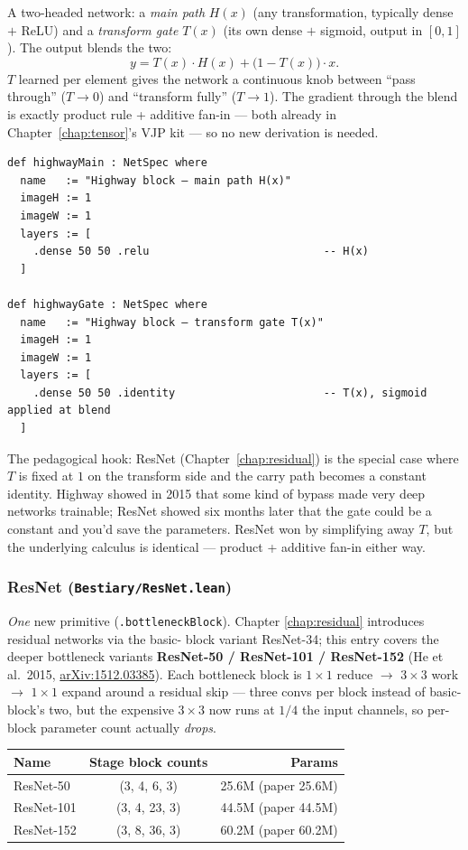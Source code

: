 A two-headed network: a \emph{main path} $H(x)$ (any transformation,
typically dense $+$ ReLU) and a \emph{transform gate} $T(x)$ (its own
dense $+$ sigmoid, output in $[0, 1]$). The output blends the two:
\[
  y = T(x) \cdot H(x) + \bigl(1 - T(x)\bigr) \cdot x.
\]
$T$ learned per element gives the network a continuous knob between
``pass through'' ($T \to 0$) and ``transform fully'' ($T \to 1$). The
gradient through the blend is exactly product rule + additive
fan-in --- both already in Chapter~\ref{chap:tensor}'s VJP kit ---
so no new derivation is needed.

\begin{verbatim}
def highwayMain : NetSpec where
  name   := "Highway block — main path H(x)"
  imageH := 1
  imageW := 1
  layers := [
    .dense 50 50 .relu                           -- H(x)
  ]

def highwayGate : NetSpec where
  name   := "Highway block — transform gate T(x)"
  imageH := 1
  imageW := 1
  layers := [
    .dense 50 50 .identity                       -- T(x), sigmoid applied at blend
  ]
\end{verbatim}

The pedagogical hook: ResNet (Chapter~\ref{chap:residual}) is the
special case where $T$ is fixed at $1$ on the transform side and the
carry path becomes a constant identity. Highway showed in 2015 that
some kind of bypass made very deep networks trainable; ResNet showed
six months later that the gate could be a constant and you'd save the
parameters. ResNet won by simplifying away $T$, but the underlying
calculus is identical --- product + additive fan-in either way.

\subsubsection*{ResNet (\texttt{Bestiary/ResNet.lean})}
\emph{One} new primitive (\texttt{.bottleneckBlock}). Chapter
\ref{chap:residual} introduces residual networks via the basic-
block variant ResNet-34; this entry covers the deeper bottleneck
variants
\textbf{ResNet-50 / ResNet-101 / ResNet-152} (He et al.\ 2015,
\href{https://arxiv.org/abs/1512.03385}{arXiv:1512.03385}). Each
bottleneck block is $1\times 1$ reduce $\to$ $3\times 3$ work
$\to$ $1\times 1$ expand around a residual skip --- three convs
per block instead of basic-block's two, but the expensive
$3\times 3$ now runs at $1/4$ the input channels, so per-block
parameter count actually \emph{drops}.

\begin{center}
\begin{tabular}{l c r}
\hline
Name & Stage block counts & Params \\
\hline
ResNet-50  & (3, 4, 6, 3)  & 25.6M (paper 25.6M) \\
ResNet-101 & (3, 4, 23, 3) & 44.5M (paper 44.5M) \\
ResNet-152 & (3, 8, 36, 3) & 60.2M (paper 60.2M) \\
\hline
\end{tabular}
\end{center}

